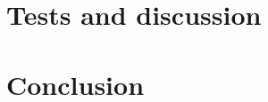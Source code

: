 \documentclass[twocolumn]{article}
\begin{document}
\section{Tests and discussion}



\section{Conclusion}



{}
\vfill
\end{document}
